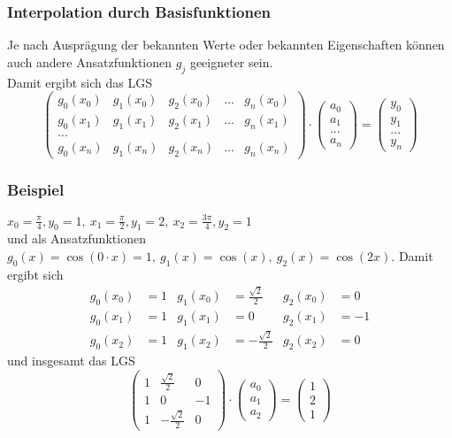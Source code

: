 %
%
\begin{frame}\frametitle{Interpolation durch Basisfunktionen}
Je nach Ausprägung der bekannten Werte oder bekannten Eigenschaften können auch andere Ansatzfunktionen $g_j$ geeigneter sein.\\
\vfill\pause
Damit ergibt sich das LGS
$$
\begin{pmatrix} g_0(x_0) & g_1(x_0) & g_2(x_0)& ... & g_n(x_0) \\g_0(x_1) & g_1(x_1) & g_2(x_1)& ... & g_n(x_1) \\...\\g_0(x_n) & g_1(x_n) & g_2(x_n)& ... & g_n(x_n) \end{pmatrix}\cdot \begin{pmatrix} a_0 \\ a_1 \\ ... \\ a_n \end{pmatrix} = \begin{pmatrix}y_0\\ y_1 \\ ... \\y_n \end{pmatrix}
$$

\end{frame}
%
\begin{frame}\frametitle{Beispiel}
$x_0=\frac{\pi}{4}, y_0=1, \ x_1=\frac{\pi}{2}, y_1=2, \ x_2=\frac{3\pi}{4}, y_2=1$\\ und als Ansatzfunktionen\\
$g_0(x)=\cos(0\cdot x)=1, \ g_1(x)=\cos(x), \ g_2(x)=\cos(2x)$.
Damit ergibt sich
\begin{align*}
g_0(x_0)&=1 & g_1(x_0)&=\frac{\sqrt{2}}{2}& g_2(x_0)&=0\\
g_0(x_1)&=1 &g_1(x_1)&=0  &g_2(x_1)&=-1\\
g_0(x_2)&=1  &g_1(x_2)&=-\frac{\sqrt{2}}{2}  &g_2(x_2)&=0
\end{align*}
und insgesamt das LGS
$$
\begin{pmatrix} 1 & \frac{\sqrt{2}}{2} & 0 \\ 1 & 0 & -1 \\ 1 & -\frac{\sqrt{2}}{2}& 0 \end{pmatrix} \cdot \begin{pmatrix} a_0 \\ a_1 \\ a_2 \end{pmatrix} = \begin{pmatrix} 1 \\ 2 \\1 \end{pmatrix}
$$
\end{frame}
